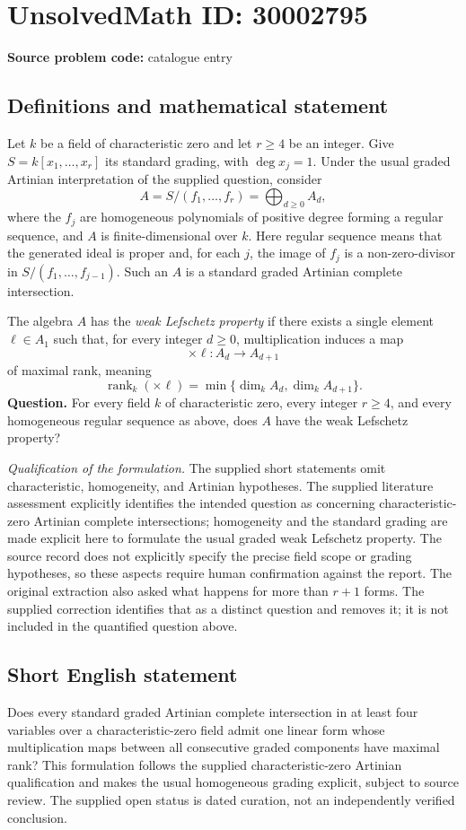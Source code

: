 \documentclass[11pt]{article}
\begin{document}
\section*{UnsolvedMath ID: 30002795}
\textbf{Source problem code:} catalogue entry
\subsection{Definitions and mathematical statement}
Let \(k\) be a field of characteristic zero and let \(r\geq 4\) be an integer. Give \(S=k[x_1,\ldots,x_r]\) its standard grading, with \(\deg x_j=1\). Under the usual graded Artinian interpretation of the supplied question, consider
\[
A=S/(f_1,\ldots,f_r)=\bigoplus_{d\geq 0}A_d,
\]
where the \(f_j\) are homogeneous polynomials of positive degree forming a regular sequence, and \(A\) is finite-dimensional over \(k\). Here regular sequence means that the generated ideal is proper and, for each \(j\), the image of \(f_j\) is a non-zero-divisor in \(S/(f_1,\ldots,f_{j-1})\). Such an \(A\) is a standard graded Artinian complete intersection.

The algebra \(A\) has the \emph{weak Lefschetz property} if there exists a single element \(\ell\in A_1\) such that, for every integer \(d\geq 0\), multiplication induces a map
\[
\times\ell:A_d\longrightarrow A_{d+1}
\]
of maximal rank, meaning
\[
\operatorname{rank}_k(\times\ell)=\min\{\dim_k A_d,\dim_k A_{d+1}\}.
\]
\textbf{Question.} For every field \(k\) of characteristic zero, every integer \(r\geq4\), and every homogeneous regular sequence as above, does \(A\) have the weak Lefschetz property?

\textit{Qualification of the formulation.} The supplied short statements omit characteristic, homogeneity, and Artinian hypotheses. The supplied literature assessment explicitly identifies the intended question as concerning characteristic-zero Artinian complete intersections; homogeneity and the standard grading are made explicit here to formulate the usual graded weak Lefschetz property. The source record does not explicitly specify the precise field scope or grading hypotheses, so these aspects require human confirmation against the report. The original extraction also asked what happens for more than \(r+1\) forms. The supplied correction identifies that as a distinct question and removes it; it is not included in the quantified question above.
\subsection{Short English statement}
Does every standard graded Artinian complete intersection in at least four variables over a characteristic-zero field admit one linear form whose multiplication maps between all consecutive graded components have maximal rank? This formulation follows the supplied characteristic-zero Artinian qualification and makes the usual homogeneous grading explicit, subject to source review. The supplied open status is dated curation, not an independently verified conclusion.
\end{document}
